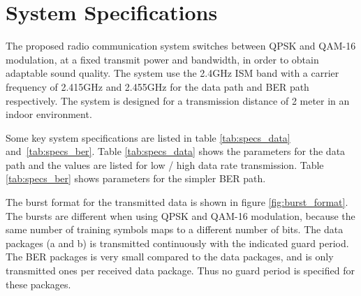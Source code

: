 \section{System Specifications}
\label{sec:specifications}
The proposed radio communication system switches between QPSK and QAM-16 modulation, at a fixed transmit power and bandwidth, in order to obtain adaptable sound quality.  The system use the 2.4GHz ISM band with a carrier frequency of 2.415GHz and 2.455GHz for the data path and BER path respectively. The system is designed for a transmission distance of 2 meter in an indoor environment.

Some key system specifications are listed in table \ref{tab:specs_data} and \ref{tab:specs_ber}. Table \ref{tab:specs_data} shows the parameters for the data path and the values are listed for low / high data rate transmission. Table \ref{tab:specs_ber} shows parameters for the simpler BER path. 


The burst format for the transmitted data is shown in figure \ref{fig:burst_format}. The bursts are different when using QPSK and QAM-16 modulation, because the same number of training symbols maps to a different number of bits. The data packages (a and b) is transmitted continuously with the indicated guard period. The BER packages is very small compared to the data packages, and is only transmitted ones per received data package. Thus no guard period is specified for these packages. 
 